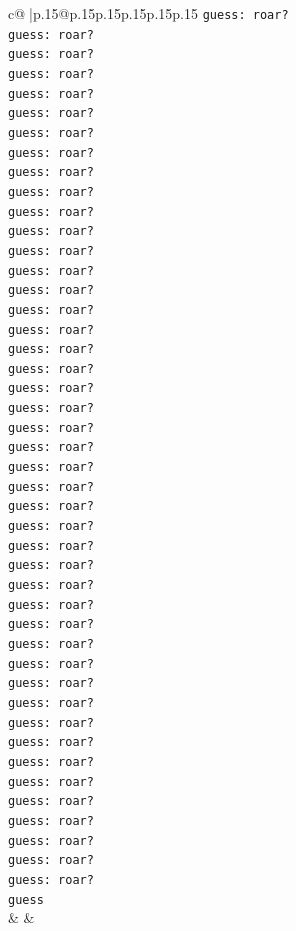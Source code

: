 \documentclass{article}
\begin{document}
{\begin{supertabular}{c@{$\;$}|p{.15\linewidth}@{}p{.15\linewidth}p{.15\linewidth}p{.15\linewidth}p{.15\linewidth}p{.15\linewidth}}
{{{\texttt{guess: roar?} \\
\texttt{guess: roar?} \\
\texttt{guess: roar?} \\
\texttt{guess: roar?} \\
\texttt{guess: roar?} \\
\texttt{guess: roar?} \\
\texttt{guess: roar?} \\
\texttt{guess: roar?} \\
\texttt{guess: roar?} \\
\texttt{guess: roar?} \\
\texttt{guess: roar?} \\
\texttt{guess: roar?} \\
\texttt{guess: roar?} \\
\texttt{guess: roar?} \\
\texttt{guess: roar?} \\
\texttt{guess: roar?} \\
\texttt{guess: roar?} \\
\texttt{guess: roar?} \\
\texttt{guess: roar?} \\
\texttt{guess: roar?} \\
\texttt{guess: roar?} \\
\texttt{guess: roar?} \\
\texttt{guess: roar?} \\
\texttt{guess: roar?} \\
\texttt{guess: roar?} \\
\texttt{guess: roar?} \\
\texttt{guess: roar?} \\
\texttt{guess: roar?} \\
\texttt{guess: roar?} \\
\texttt{guess: roar?} \\
\texttt{guess: roar?} \\
\texttt{guess: roar?} \\
\texttt{guess: roar?} \\
\texttt{guess: roar?} \\
\texttt{guess: roar?} \\
\texttt{guess: roar?} \\
\texttt{guess: roar?} \\
\texttt{guess: roar?} \\
\texttt{guess: roar?} \\
\texttt{guess: roar?} \\
\texttt{guess: roar?} \\
\texttt{guess: roar?} \\
\texttt{guess: roar?} \\
\texttt{guess: roar?} \\
\texttt{guess: roar?} \\
\texttt{guess} \\
            }
        }
    }
    & & \\ \\


\end{supertabular}}
\end{document}
